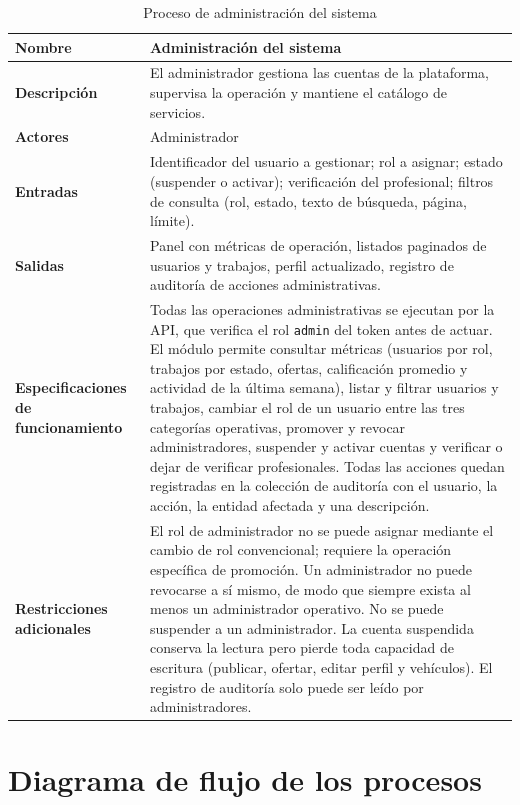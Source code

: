 \documentclass[doc,12pt,a4paper]{apa7}
\begin{document}
\begin{longtable}{|P{3.3cm}|L{11.2cm}|}
\caption{Proceso de administración del sistema}\\
\hline
\textbf{Nombre} & Administración del sistema \\ \hline
\textbf{Descripción} & El administrador gestiona las cuentas de la plataforma, supervisa la operación y mantiene el catálogo de servicios. \\ \hline
\textbf{Actores} & Administrador \\ \hline
\textbf{Entradas} & Identificador del usuario a gestionar; rol a asignar; estado (suspender o activar); verificación del profesional; filtros de consulta (rol, estado, texto de búsqueda, página, límite). \\ \hline
\textbf{Salidas} & Panel con métricas de operación, listados paginados de usuarios y trabajos, perfil actualizado, registro de auditoría de acciones administrativas. \\ \hline
\textbf{Especificaciones de funcionamiento} & Todas las operaciones administrativas se ejecutan por la API, que verifica el rol \texttt{admin} del token antes de actuar. El módulo permite consultar métricas (usuarios por rol, trabajos por estado, ofertas, calificación promedio y actividad de la última semana), listar y filtrar usuarios y trabajos, cambiar el rol de un usuario entre las tres categorías operativas, promover y revocar administradores, suspender y activar cuentas y verificar o dejar de verificar profesionales. Todas las acciones quedan registradas en la colección de auditoría con el usuario, la acción, la entidad afectada y una descripción. \\ \hline
\textbf{Restricciones adicionales} & El rol de administrador no se puede asignar mediante el cambio de rol convencional; requiere la operación específica de promoción. Un administrador no puede revocarse a sí mismo, de modo que siempre exista al menos un administrador operativo. No se puede suspender a un administrador. La cuenta suspendida conserva la lectura pero pierde toda capacidad de escritura (publicar, ofertar, editar perfil y vehículos). El registro de auditoría solo puede ser leído por administradores. \\ \hline
\end{longtable}

\section{Diagrama de flujo de los procesos}
\end{document}
